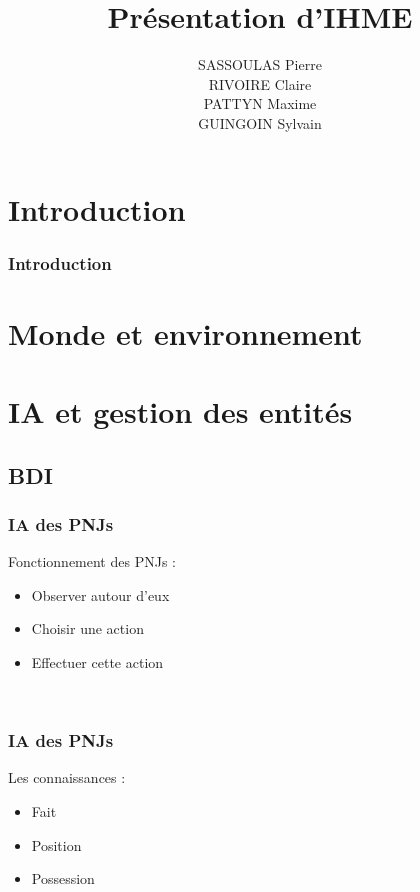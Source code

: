 \documentclass{beamer}
\title{Présentation d'IHME}
\author{SASSOULAS Pierre\\RIVOIRE Claire\\PATTYN Maxime\\GUINGOIN Sylvain}
\begin{document}
\frame{\titlepage}
\frame{\tableofcontents}

\section{Introduction}
\begin{frame}
  \frametitle{Introduction}
\end{frame}

\section{Monde et environnement}
\begin{frame}
  
\end{frame}

\section{IA et gestion des entités}

\subsection{BDI}
\begin{frame}
  \frametitle{IA des PNJs}
  Fonctionnement des PNJs :
  \begin{itemize}
  \item Observer autour d'eux
  \item Choisir une action
  \item Effectuer cette action
  \end{itemize}
  ~\\  
\end{frame}

\begin{frame}
  \frametitle{IA des PNJs}
  Les connaissances :
  \begin{itemize}
  \item Fait
  \item Position
  \item Possession
  \end{itemize}
  ~\\
\end{frame}
\end{document}
